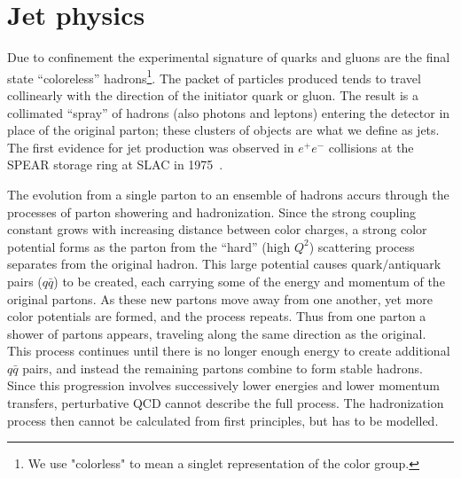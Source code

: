 \section{Jet physics}\label{sec:jets}

Due to confinement the experimental signature of quarks and gluons are the final state ``coloreless'' hadrons\footnote{We use "colorless" to mean a singlet representation of the color group.}.  The packet of particles produced tends to travel collinearly with the direction of the initiator quark or gluon. The result is a collimated ``spray'' of hadrons (also photons and leptons) entering the detector in place of the original parton; these clusters of objects are what we define as jets.
The first evidence for jet production was observed in $e^+e^-$ collisions at the SPEAR storage ring at SLAC in 1975~\cite{PhysRevLett.35.1609}. 


The evolution from a single parton to an ensemble of hadrons accurs through the processes of parton showering and hadronization. Since the strong coupling constant grows with increasing distance between color charges, a strong color potential forms as the parton from the ``hard'' (high $Q^2$) scattering process separates from the original hadron. This large potential causes quark$/$antiquark pairs ($q\bar{q}$) to be created, each carrying some of the energy and momentum of the original partons. As these new partons move away from one another, yet more color potentials are formed, and the process repeats. Thus from one parton a shower of partons appears, traveling along the same direction as the original.  This process continues until there is no longer enough energy to create additional $q\bar{q}$ pairs, and instead the remaining partons combine to form stable hadrons. Since this progression involves successively lower energies and lower momentum transfers, perturbative QCD cannot describe the full process.  The hadronization process then cannot be calculated from first principles, but has to be modelled.


